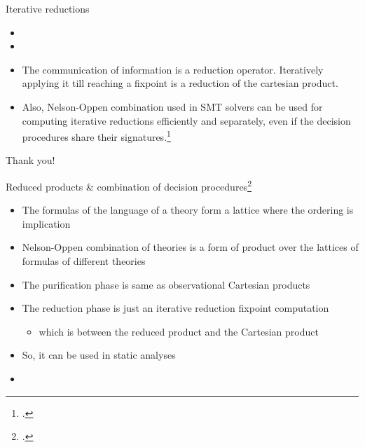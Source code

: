 \documentclass[aspectratio=169]{beamer}
\begin{document}
\begin{frame}{Iterative reductions}
  \small
  \begin{itemize}
  \item {}
  \item {}
  \item The communication of information is a reduction operator. Iteratively applying it till reaching a fixpoint is a reduction of the cartesian product.
  \item Also, Nelson-Oppen combination used in SMT solvers can be used for computing iterative reductions efficiently and separately, even if the decision procedures share their signatures.\footcite{cousot2011reduced}
  \end{itemize}
\end{frame}

\begin{frame}[standout]
  Thank you!
\end{frame}

\appendix

\begin{frame}{Reduced products \& combination of decision procedures\footcite{cousot2011reduced}}
  \footnotesize
  \begin{itemize}
  \item The formulas of the language of a theory form a lattice where the ordering is implication
  \item Nelson-Oppen combination of theories is a form of product over the lattices of formulas of different theories
  \item The purification phase is same as observational Cartesian products
  \item The reduction phase is just an iterative reduction fixpoint computation
    \begin{itemize}
    \item which is between the reduced product and the Cartesian product
    \end{itemize}
  \item So, it can be used in static analyses
  \item {}
  \end{itemize}
\end{frame}
\end{document}

